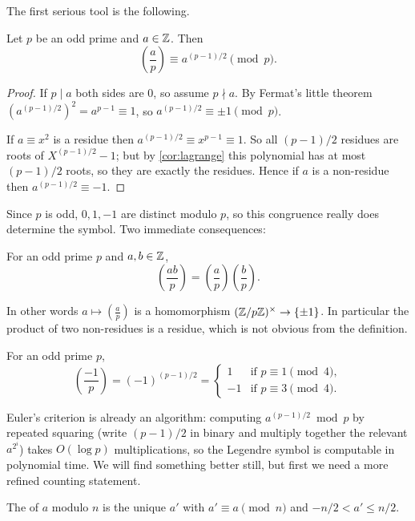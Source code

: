 \documentclass[a4paper]{scrartcl}
\newcommand{\leg}[2]{\left( \frac{#1}{#2} \right)}
\begin{document}
The first serious tool is the following.

\begin{theorem}\label{nt-thm:euler}
	Let $p$ be an odd prime and $a \in \mathbb{Z}$. Then
	$$
	\leg ap \equiv a^{(p-1)/2} \pmod p.
	$$
\end{theorem}
\begin{proof}
	If $p \mid a$ both sides are $0$, so assume $p \nmid a$. By Fermat's little theorem $(a^{(p-1)/2})^2 = a^{p-1} \equiv 1$, so $a^{(p-1)/2} \equiv \pm 1 \pmod p$.

	If $a \equiv x^2$ is a residue then $a^{(p-1)/2} \equiv x^{p-1} \equiv 1$. So all $(p-1)/2$ residues are roots of $X^{(p-1)/2} - 1$; but by \autoref{cor:lagrange} this polynomial has at most $(p-1)/2$ roots, so they are exactly the residues. Hence if $a$ is a non-residue then $a^{(p-1)/2} \equiv -1$.
\end{proof}

Since $p$ is odd, $0, 1, -1$ are distinct modulo $p$, so this congruence really does determine the symbol. Two immediate consequences:

\begin{corollary}\label{cor:multiplicative}
	For an odd prime $p$ and $a, b \in \mathbb{Z}$,
	$$
	\leg{ab}p = \leg ap \leg bp.
	$$
\end{corollary}

In other words $a \mapsto \left( \frac ap \right)$ is a homomorphism $(\mathbb{Z}/p\mathbb{Z})^\times \to \{\pm 1\}$. In particular the product of two non-residues is a residue, which is not obvious from the definition.

\begin{corollary}\label{cor:minusone}
	For an odd prime $p$,
	$$
	\leg{-1}p = (-1)^{(p-1)/2} = \begin{cases}
		1 & \text{if } p \equiv 1 \pmod 4, \\
		-1 & \text{if } p \equiv 3 \pmod 4.
	\end{cases}
	$$
\end{corollary}

Euler's criterion is already an algorithm: computing $a^{(p-1)/2} \bmod p$ by repeated squaring (write $(p-1)/2$ in binary and multiply together the relevant $a^{2^i}$) takes $O(\log p)$ multiplications, so the Legendre symbol is computable in polynomial time. We will find something better still, but first we need a more refined counting statement.

\begin{definition}
	The  of $a$ modulo $n$ is the unique $a'$ with $a' \equiv a \pmod n$ and $-n/2 < a' \leq n/2$.
\end{definition}
\end{document}
